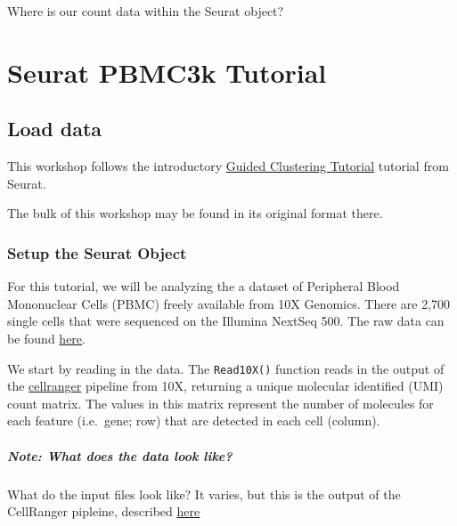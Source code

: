 \documentclass[
]{book}
\begin{document}
Where is our count data within the Seurat object?

\hypertarget{part-seurat-pbmc3k-tutorial}{%
\part{Seurat PBMC3k Tutorial}\label{part-seurat-pbmc3k-tutorial}}

\hypertarget{load}{%
\chapter{Load data}\label{load}}

This workshop follows the introductory \href{https://satijalab.org/seurat/articles/pbmc3k_tutorial.html}{Guided Clustering Tutorial} tutorial from Seurat.

The bulk of this workshop may be found in its original format there.

\hypertarget{setup-the-seurat-object}{%
\section{Setup the Seurat Object}\label{setup-the-seurat-object}}

For this tutorial, we will be analyzing the a dataset of Peripheral Blood Mononuclear Cells (PBMC) freely available from 10X Genomics. There are 2,700 single cells that were sequenced on the Illumina NextSeq 500. The raw data can be found \href{https://cf.10xgenomics.com/samples/cell/pbmc3k/pbmc3k_filtered_gene_bc_matrices.tar.gz}{here}.

We start by reading in the data. The \texttt{Read10X()} function reads in the output of the \href{https://support.10xgenomics.com/single-cell-gene-expression/software/pipelines/latest/what-is-cell-ranger}{cellranger} pipeline from 10X, returning a unique molecular identified (UMI) count matrix. The values in this matrix represent the number of molecules for each feature (i.e.~gene; row) that are detected in each cell (column).

\hypertarget{note-what-does-the-data-look-like}{%
\subsubsection*{Note: What does the data look like?}\label{note-what-does-the-data-look-like}}

What do the input files look like? It varies, but this is the output of the CellRanger pipleine, described \href{https://support.10xgenomics.com/single-cell-gene-expression/software/pipelines/latest/output/gex-outputs}{here}
\end{document}
